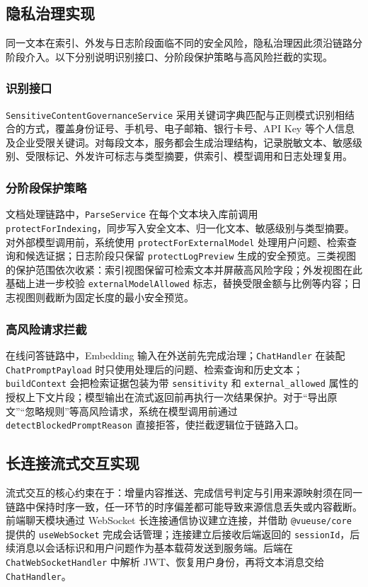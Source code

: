 \subsection{隐私治理实现}

同一文本在索引、外发与日志阶段面临不同的安全风险，隐私治理因此须沿链路分阶段介入。以下分别说明识别接口、分阶段保护策略与高风险拦截的实现。

\subsubsection{识别接口}
\texttt{SensitiveContentGovernanceService} 采用关键词字典匹配与正则模式识别相结合的方式，覆盖身份证号、手机号、电子邮箱、银行卡号、API Key 等个人信息及企业受限关键词。对每段文本，服务都会生成治理结构，记录脱敏文本、敏感级别、受限标记、外发许可标志与类型摘要，供索引、模型调用和日志处理复用。

\subsubsection{分阶段保护策略}
文档处理链路中，\texttt{ParseService} 在每个文本块入库前调用 \texttt{protectForIndexing}，同步写入安全文本、归一化文本、敏感级别与类型摘要。对外部模型调用前，系统使用 \texttt{protectForExternalModel} 处理用户问题、检索查询和候选证据；日志阶段只保留 \texttt{protectLogPreview} 生成的安全预览。三类视图的保护范围依次收紧：索引视图保留可检索文本并屏蔽高风险字段；外发视图在此基础上进一步校验 \texttt{externalModelAllowed} 标志，替换受限金额与比例等内容；日志视图则截断为固定长度的最小安全预览。

\subsubsection{高风险请求拦截}
在线问答链路中，Embedding 输入在外送前先完成治理；\texttt{ChatHandler} 在装配 \texttt{ChatPromptPayload} 时只使用处理后的问题、检索查询和历史文本；\texttt{buildContext} 会把检索证据包装为带 \texttt{sensitivity} 和 \texttt{external\_allowed} 属性的授权上下文片段；模型输出在流式返回前再执行一次结果保护。对于“导出原文”“忽略规则”等高风险请求，系统在模型调用前通过 \texttt{detectBlockedPromptReason} 直接拒答，使拦截逻辑位于链路入口。

\subsection{长连接流式交互实现}

流式交互的核心约束在于：增量内容推送、完成信号判定与引用来源映射须在同一链路中保持时序一致，任一环节的时序偏差都可能导致来源信息丢失或内容截断。前端聊天模块通过 WebSocket 长连接通信协议建立连接，并借助 \texttt{@vueuse/core} 提供的 \texttt{useWebSocket} 完成会话管理；连接建立后接收后端返回的 \texttt{sessionId}，后续消息以会话标识和用户问题作为基本载荷发送到服务端。后端在 \texttt{ChatWebSocketHandler} 中解析 JWT、恢复用户身份，再将文本消息交给 \texttt{ChatHandler}。

